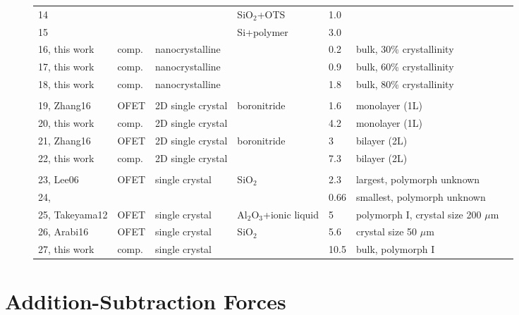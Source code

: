 \begin{figure}[htbp]
{\begin{tabular}{lllllll}
			14                    &       &                         & SiO$_2$+OTS  &  1.0      &      \\
			15                  &       &                         & Si+polymer   &  3.0   &         \\
			16,  this work &   comp.        & nanocrystalline &  & 0.2 & bulk, 30\% crystallinity \\
			17,  this work &   comp.        & nanocrystalline &  & 0.9 & bulk,  60\% crystallinity \\
			18,  this work &   comp.       & nanocrystalline &  & 1.8 & bulk, 80\% crystallinity \\
			\hline \\
			19,   Zhang16 & OFET & 2D single crystal & boronitride &  1.6 & monolayer (1L)  \\
			20,  this work &   comp.        & 2D single crystal &   & 4.2 & monolayer (1L) \\
			21,  Zhang16 & OFET & 2D single crystal & boronitride &  3 & bilayer (2L)  \\
			22,  this work &   comp.        & 2D single crystal &   & 7.3  & bilayer (2L) \\
			\hline \\
			23, Lee06 & OFET & single crystal & SiO$_2$ & 2.3 & largest, polymorph unknown \\
			24, &  &  & & 0.66 & smallest, polymorph unknown \\
			25, Takeyama12 & OFET & single crystal & Al$_2$O$_3$+ionic liquid & 5 & polymorph I, crystal size 200 $\mu$m \\
			26,  Arabi16 & OFET &  single crystal & SiO$_2$ & 5.6 & crystal size 50 $\mu$m \\
			27,  this work &   comp.        &  single crystal &   & 10.5 & bulk, polymorph I \\
		\end{tabular}
}
\end{figure}


\chapter{Addition-Subtraction Forces}
\label{ap:EwaldForcesAddSub}

